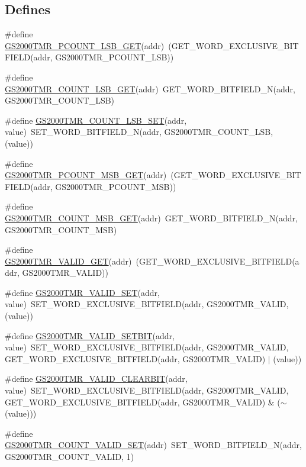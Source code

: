 \subsection*{Defines}
\begin{DoxyCompactItemize}
\item 
\#define \hyperlink{a00555_a0b52d1fcab116de6ecb5cd71e74c1777}{GS2000TMR\_\-PCOUNT\_\-LSB\_\-GET}(addr)~(GET\_\-WORD\_\-EXCLUSIVE\_\-BITFIELD(addr, GS2000TMR\_\-PCOUNT\_\-LSB))
\item 
\#define \hyperlink{a00555_a664191c2ed5762ca295d73e60117bf04}{GS2000TMR\_\-COUNT\_\-LSB\_\-GET}(addr)~GET\_\-WORD\_\-BITFIELD\_\-N(addr, GS2000TMR\_\-COUNT\_\-LSB)
\item 
\#define \hyperlink{a00555_a50c97fb02a4ab8a77b583cd91a2eaee8}{GS2000TMR\_\-COUNT\_\-LSB\_\-SET}(addr, value)~SET\_\-WORD\_\-BITFIELD\_\-N(addr, GS2000TMR\_\-COUNT\_\-LSB, (value))
\item 
\#define \hyperlink{a00555_aac040c3a9540039cd7fa5272975ae67d}{GS2000TMR\_\-PCOUNT\_\-MSB\_\-GET}(addr)~(GET\_\-WORD\_\-EXCLUSIVE\_\-BITFIELD(addr, GS2000TMR\_\-PCOUNT\_\-MSB))
\item 
\#define \hyperlink{a00555_a4ac420b0b1523d8072ed1e9a0ff2406d}{GS2000TMR\_\-COUNT\_\-MSB\_\-GET}(addr)~GET\_\-WORD\_\-BITFIELD\_\-N(addr, GS2000TMR\_\-COUNT\_\-MSB)
\item 
\#define \hyperlink{a00555_ae1e2eefd932955c284ce1dda0f4811a8}{GS2000TMR\_\-VALID\_\-GET}(addr)~(GET\_\-WORD\_\-EXCLUSIVE\_\-BITFIELD(addr, GS2000TMR\_\-VALID))
\item 
\#define \hyperlink{a00555_a41da72752555e6d4ac79458b5913a795}{GS2000TMR\_\-VALID\_\-SET}(addr, value)~SET\_\-WORD\_\-EXCLUSIVE\_\-BITFIELD(addr, GS2000TMR\_\-VALID, (value))
\item 
\#define \hyperlink{a00555_a671cd21b6043447f1586626552771d3c}{GS2000TMR\_\-VALID\_\-SETBIT}(addr, value)~SET\_\-WORD\_\-EXCLUSIVE\_\-BITFIELD(addr, GS2000TMR\_\-VALID, GET\_\-WORD\_\-EXCLUSIVE\_\-BITFIELD(addr, GS2000TMR\_\-VALID) $|$ (value))
\item 
\#define \hyperlink{a00555_a09c648fbb501aabd4caf6bf1ee09952d}{GS2000TMR\_\-VALID\_\-CLEARBIT}(addr, value)~SET\_\-WORD\_\-EXCLUSIVE\_\-BITFIELD(addr, GS2000TMR\_\-VALID, GET\_\-WORD\_\-EXCLUSIVE\_\-BITFIELD(addr, GS2000TMR\_\-VALID) \& ($\sim$(value)))
\item 
\#define \hyperlink{a00555_a8a4cad5ea0774d9635c6b530485a9ab6}{GS2000TMR\_\-COUNT\_\-VALID\_\-SET}(addr)~SET\_\-WORD\_\-BITFIELD\_\-N(addr, GS2000TMR\_\-COUNT\_\-VALID, 1)
\item 

\end{DoxyCompactItemize}
